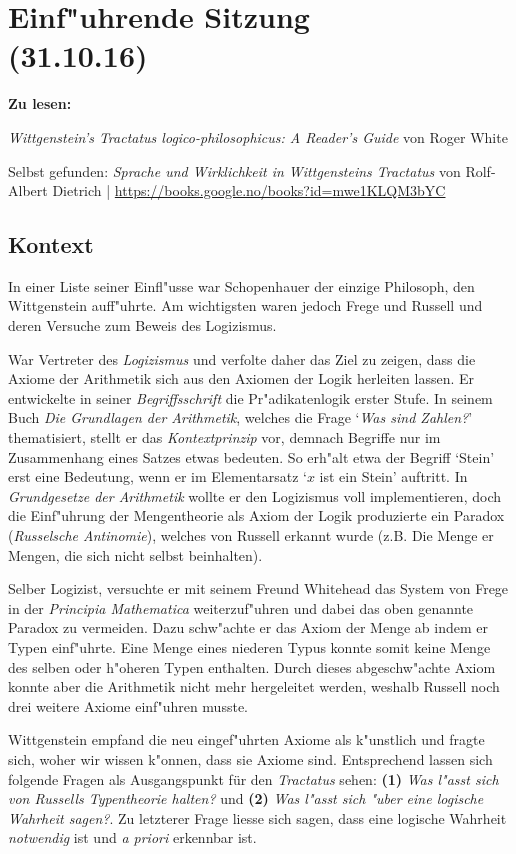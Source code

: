 \documentclass[]{scrartcl}
\begin{document}
\section{Einf"uhrende Sitzung\\(31.10.16)}

\textbf{Zu lesen:} 

\emph{Wittgenstein's Tractatus logico-philosophicus: A Reader's Guide} von Roger White

Selbst gefunden: 
\emph{Sprache und Wirklichkeit in Wittgensteins Tractatus} von Rolf-Albert Dietrich | \url{https://books.google.no/books?id=mwe1KLQM3bYC}

\subsection{Kontext}

In einer Liste seiner Einfl"usse war Schopenhauer der einzige Philosoph, den Wittgenstein auff"uhrte. Am wichtigsten waren jedoch Frege und Russell und deren Versuche zum Beweis des Logizismus.

\begin{description}[leftmargin=!,labelwidth=\widthof{\bfseries 2}]
  \item[Frege] War Vertreter des \emph{Logizismus} und verfolte daher das Ziel zu zeigen, dass die Axiome der Arithmetik sich aus den Axiomen der Logik herleiten lassen. Er entwickelte in seiner \emph{Begriffsschrift} die Pr"adikatenlogik erster Stufe. In seinem Buch \emph{Die Grundlagen der Arithmetik}, welches die Frage `\emph{Was sind Zahlen?}' thematisiert, stellt er das \emph{Kontextprinzip} vor, demnach Begriffe nur im Zusammenhang eines Satzes etwas bedeuten. So erh"alt etwa der Begriff `Stein' erst eine Bedeutung, wenn er im Elementarsatz `$x$ ist ein Stein' auftritt. In \emph{Grundgesetze der Arithmetik} wollte er den Logizismus voll implementieren, doch die Einf"uhrung der Mengentheorie als Axiom der Logik produzierte ein Paradox (\emph{Russelsche Antinomie}), welches von Russell erkannt wurde (z.B. Die Menge er Mengen, die sich nicht selbst beinhalten).
  \item[Russell] Selber Logizist, versuchte er mit seinem Freund Whitehead das System von Frege in der \emph{Principia Mathematica} weiterzuf"uhren und dabei das oben genannte Paradox zu vermeiden. Dazu schw"achte er das Axiom der Menge ab indem er Typen einf"uhrte. Eine Menge eines niederen Typus konnte somit keine Menge des selben oder h"oheren Typen enthalten. Durch dieses abgeschw"achte Axiom konnte aber die Arithmetik nicht mehr hergeleitet werden, weshalb Russell noch drei weitere Axiome einf"uhren musste.
  \item[Wittgensteins Einw"ande] Wittgenstein empfand die neu eingef"uhrten Axiome als k"unstlich und fragte sich, woher wir wissen k"onnen, dass sie Axiome sind. Entsprechend lassen sich folgende Fragen als Ausgangspunkt für den \emph{Tractatus} sehen: \textbf{(1)} \emph{Was l"asst sich von Russells Typentheorie halten?} und \textbf{(2)} \emph{Was l"asst sich "uber eine logische Wahrheit sagen?}. Zu letzterer Frage liesse sich sagen, dass eine logische Wahrheit \emph{notwendig} ist und \emph{a priori} erkennbar ist.
\end{description}
\end{document}
